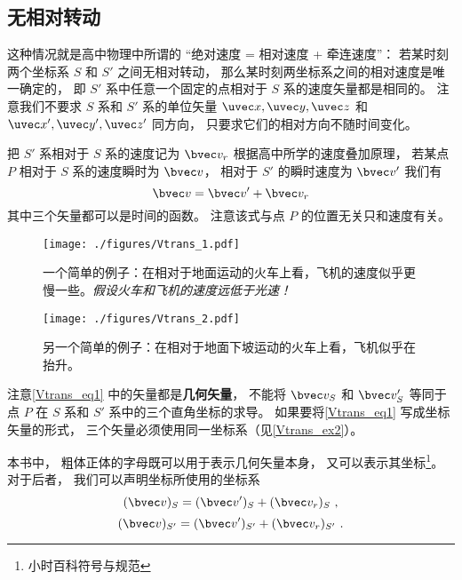 


\subsection{无相对转动}
这种情况就是高中物理中所谓的 “绝对速度 = 相对速度 + 牵连速度”： 若某时刻两个坐标系 $S$ 和 $S'$ 之间无相对转动， 那么某时刻两坐标系之间的相对速度是唯一确定的， 即 $S'$ 系中任意一个固定的点相对于 $S$ 系的速度矢量都是相同的。 注意我们不要求 $S$ 系和 $S'$ 系的单位矢量 $\uvec x, \uvec y, \uvec z$ 和 $\uvec x', \uvec y', \uvec z'$ 同方向， 只要求它们的相对方向不随时间变化。

把 $S'$ 系相对于 $S$ 系的速度记为 $\bvec v_r$ 根据高中所学的速度叠加原理， 若某点 $P$ 相对于 $S$ 系的速度瞬时为 $\bvec v$， 相对于 $S'$ 的瞬时速度为 $\bvec v'$ 我们有
\begin{equation}\label{Vtrans_eq1}
\bvec v = \bvec v' + \bvec v_r
\end{equation}
其中三个矢量都可以是时间的函数。 注意该式与点 $P$ 的位置无关只和速度有关。

\begin{figure}[ht]
\centering
\texttt{[image: ./figures/Vtrans\_1.pdf]}
\caption{一个简单的例子：在相对于地面运动的火车上看，飞机的速度似乎更慢一些。\textsl{假设火车和飞机的速度远低于光速！}} \label{Vtrans_fig1}
\end{figure}

\begin{figure}[ht]
\centering
\texttt{[image: ./figures/Vtrans\_2.pdf]}
\caption{另一个简单的例子：在相对于地面下坡运动的火车上看，飞机似乎在抬升。} \label{Vtrans_fig2}
\end{figure}

注意\autoref{Vtrans_eq1} 中的矢量都是\textbf{几何矢量}， 不能将 $\bvec v_S$ 和 $\bvec v_S'$ 等同于点 $P$ 在 $S$ 系和 $S'$ 系中的三个直角坐标的求导。 如果要将\autoref{Vtrans_eq1} 写成坐标矢量的形式， 三个矢量必须使用同一坐标系（见\autoref{Vtrans_ex2}）。

本书中， 粗体正体的字母既可以用于表示几何矢量本身， 又可以表示其坐标\footnote{小时百科符号与规范}。 对于后者， 我们可以声明坐标所使用的坐标系
\begin{equation}\label{Vtrans_eq5}
(\bvec v)_{S} = (\bvec v')_{S} + (\bvec v_r)_{S}~,
\end{equation}
\begin{equation}\label{Vtrans_eq6}
(\bvec v)_{S'} = (\bvec v')_{S'} + (\bvec v_r)_{S'}~.
\end{equation}


